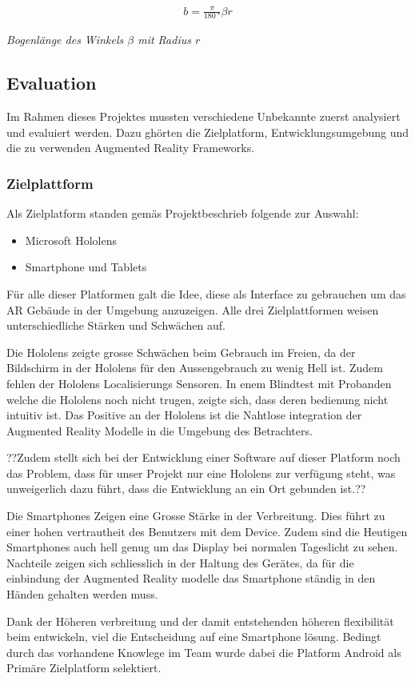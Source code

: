 \documentclass[a4paper]{scrreprt}
\newcommand{\myequations}[1]{
	\addcontentsline{equ}{myequations}{\protect\numberline{\theequation}#1}
}
\newcommand{\indexequation}[3]{
	\begin{align} \label{#3} \ensuremath{\boxed{#1}} \end{align}
	\myequations{#3} \centering \small \textit{#2} \normalsize \justify }
\begin{document}
\indexequation{b = \frac{\pi}{\SI{180}{\degree}}\beta r}{Bogenlänge des Winkels $\beta$ mit Radius $r$}{Bogenlaenge}

\subsection{Evaluation}
Im Rahmen dieses Projektes mussten verschiedene Unbekannte zuerst analysiert und evaluiert werden. Dazu ghörten die Zielplatform, Entwicklungsumgebung und die zu verwenden Augmented Reality Frameworks.
\subsubsection{Zielplattform}
Als Zielplatform standen gemäs Projektbeschrieb folgende zur Auswahl:
\begin{itemize}
\item Microsoft Hololens
\item Smartphone und Tablets
\end{itemize}
Für alle dieser Platformen galt die Idee, diese als Interface zu gebrauchen um das AR Gebäude in der Umgebung anzuzeigen. Alle drei Zielplattformen weisen unterschiedliche Stärken und Schwächen auf.



Die Hololens zeigte grosse Schwächen beim Gebrauch im Freien, da der Bildschirm in der Hololens für den Aussengebrauch zu wenig Hell ist. Zudem fehlen der Hololens Localisierungs Sensoren. In enem Blindtest mit Probanden welche die Hololens noch nicht trugen, zeigte sich, dass deren bedienung nicht intuitiv ist.
Das Positive an der Hololens ist die Nahtlose integration der Augmented Reality Modelle in die Umgebung des Betrachters.


??Zudem stellt sich bei der Entwicklung einer Software auf dieser Platform noch das Problem, dass für unser Projekt nur eine Hololens zur verfügung steht, was unweigerlich dazu führt, dass die Entwicklung an ein Ort gebunden ist.??
 
 
 
Die Smartphones Zeigen eine Grosse Stärke in der Verbreitung. Dies führt zu einer hohen vertrautheit des Benutzers mit dem Device. Zudem sind die Heutigen Smartphones auch hell genug um das Display bei normalen Tageslicht zu sehen.
Nachteile zeigen sich schliesslich in der Haltung des Gerätes, da für die einbindung der Augmented Reality modelle das Smartphone ständig in den Händen gehalten werden muss. 

Dank der Höheren verbreitung und der damit entstehenden höheren flexibilität beim entwickeln, viel die Entscheidung auf eine Smartphone lösung. Bedingt durch das vorhandene Knowlege im Team wurde dabei die Platform Android als Primäre Zielplatform selektiert.
\end{document}
